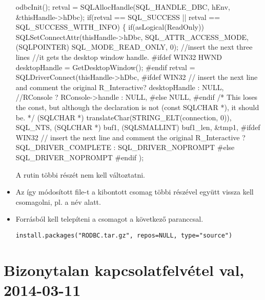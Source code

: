 \begin{itemize}
\begin{VBAframe}
    odbcInit();
    retval = SQLAllocHandle(SQL_HANDLE_DBC, hEnv, &thisHandle->hDbc);
    if(retval == SQL_SUCCESS || retval == SQL_SUCCESS_WITH_INFO) \{
      if(asLogical(ReadOnly))
        SQLSetConnectAttr(thisHandle->hDbc, SQL_ATTR_ACCESS_MODE, 
          (SQLPOINTER) SQL_MODE_READ_ONLY, 0);{ 
         //insert the next three lines 
          //it gets the desktop window handle.
#ifdef WIN32
         HWND desktopHandle = GetDesktopWindow();
#endif}
         retval =
           SQLDriverConnect(thisHandle->hDbc, {
#ifdef WIN32
             // insert the next line and comment the original
             R_Interactive? desktopHandle : NULL, 
             //RConsole ? RConsole->handle : NULL,
#else
             NULL,
#endif
}            /* This loses the const, but although the
                declaration is not (const SQLCHAR *),
                it should be. */
             (SQLCHAR *) translateChar(STRING_ELT(connection, 0)),
             SQL_NTS,
             (SQLCHAR *) buf1,
             (SQLSMALLINT) buf1_len,
             &tmp1,{
#ifdef WIN32
               // insert the next line and comment the original
               R_Interactive ? SQL_DRIVER_COMPLETE : SQL_DRIVER_NOPROMPT
#else
               SQL_DRIVER_NOPROMPT
#endif}
             );
\end{VBAframe}
A rutin többi részét nem kell változtatni.
\item Az így módosított file-t a kibontott csomag többi részével
  együtt vissza kell csomagolni,  
  pl. a  név alatt.
\item Forrásból kell telepíteni a csomagot a következő paranccsal.
\begin{verbatim}
install.packages("RODBC.tar.gz", repos=NULL, type="source")
\end{verbatim}

\end{itemize}

\section{Bizonytalan kapcsolatfelvétel val, 
2014-03-11}
\label{sec:10.2}

